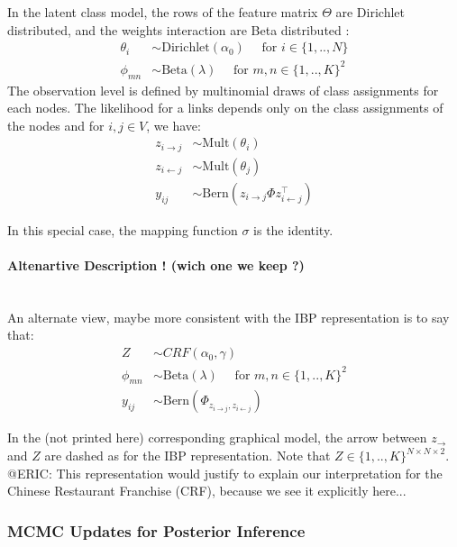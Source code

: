 In the latent class model, the rows of the feature matrix $\Theta$ are Dirichlet distributed, and the weights interaction are Beta distributed : 
\begin{align}
\theta_i &\sim \mathrm{Dirichlet}(\alpha_0) \quad\text{ for }  i \in \{1, .., N\} \\
\phi_{mn} &\sim \mathrm{Beta}(\lambda) \quad\text{ for }  m,n \in \{1, .., K\}^2 
\end{align}
The observation level is defined by multinomial draws of class assignments for each nodes. The likelihood for a links depends only on the class assignments of the nodes  and for $i, j \in V$, we have:  
\begin{align}
z_{i\rightarrow j} &\sim \mathrm{Mult}(\theta_i) \\
z_{i\leftarrow j} &\sim \mathrm{Mult}(\theta_j) \\
y_{ij} &\sim \mathrm{Bern}(z_{i\rightarrow j} \Phi z_{i\leftarrow j}^\top)
\end{align}

In this special case, the mapping function $\sigma$ is the identity.

\paragraph{Altenartive Description ! (wich one we keep ?)}~\\

An alternate view, maybe more consistent with the IBP representation is to say that:
\begin{align}
Z &\sim CRF(\alpha_0, \gamma) \\
\phi_{mn} &\sim \mathrm{Beta}(\lambda) \quad\text{ for }  m,n \in \{1, .., K\}^2  \\
y_{ij} &\sim \mathrm{Bern}(\Phi_{z_{i\rightarrow j} , z_{i\leftarrow j}})
\end{align}

In the (not printed here) corresponding graphical model, the arrow between $z_{\rightarrow}$ and $Z$ are dashed as for the IBP representation. Note that $Z \in \{1,.., K\}^{N\times N \times 2}$. ~\\

@ERIC: This representation would justify to explain our interpretation for the Chinese Restaurant Franchise (CRF), because we see it explicitly here...

\subsubsection{MCMC Updates for Posterior Inference}~\\

